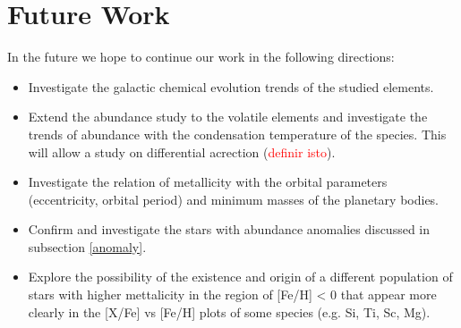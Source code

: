 \documentclass[dvips,12pt,a4paper]{report}
\begin{document}
{{\begin{itemize}
\end{itemize}

\section {Future Work}

In the future we hope to continue our work in the following directions:

\begin{itemize}
 
\item Investigate the galactic chemical evolution trends of the studied elements.

\item Extend the abundance study to the volatile elements and investigate the trends of abundance with the condensation temperature of the species. This will allow a study on differential acrection (\textcolor{red}{definir isto}).

\item Investigate the relation of metallicity with the orbital parameters (eccentricity, orbital period) and minimum masses of the planetary bodies.

\item Confirm and investigate the stars with abundance anomalies discussed in subsection \ref{anomaly}.

\item Explore the possibility of the existence and origin of a different population of stars with higher mettalicity in the region of [Fe/H] < 0 that appear more clearly in the [X/Fe] vs [Fe/H] plots of some species (e.g. Si, Ti, Sc, Mg).

\end{itemize}

 









}}
\end{document}
